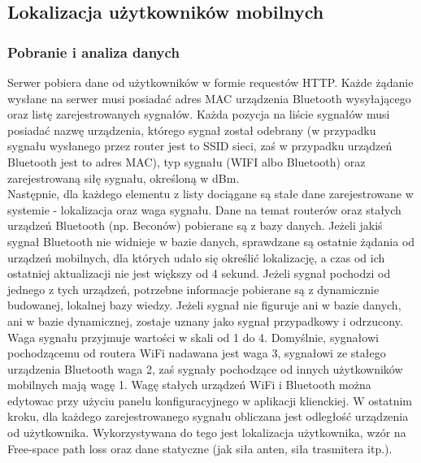\subsection{Lokalizacja użytkowników mobilnych}
\subsubsection{Pobranie i analiza danych}
Serwer pobiera dane od użytkowników w formie requestów HTTP. Każde żądanie wysłane na serwer musi posiadać adres MAC urządzenia Bluetooth wysyłającego oraz listę zarejestrowanych sygnałów. Każda pozycja na liście sygnałów musi posiadać nazwę urządzenia, którego sygnał został odebrany (w przypadku sygnału wysłanego przez router jest to SSID sieci, zaś w przypadku urządzeń Bluetooth jest to adres MAC), typ sygnału (WIFI albo Bluetooth) oraz zarejestrowaną siłę sygnału, określoną w dBm. \\
Następnie, dla każdego elementu z listy dociągane są stałe dane zarejestrowane w systemie - lokalizacja oraz waga sygnału. Dane na temat routerów oraz stałych urządzeń Bluetooth (np. Beconów) pobierane są z bazy danych. Jeżeli jakiś sygnał Bluetooth nie widnieje w bazie danych, sprawdzane są ostatnie żądania od urządzeń mobilnych, dla których udało się określić lokalizację, a czas od ich ostatniej aktualizacji nie jest większy od 4 sekund. Jeżeli sygnał pochodzi od jednego z tych urządzeń, potrzebne informacje pobierane są z dynamicznie budowanej, lokalnej bazy wiedzy. Jeżeli sygnał nie figuruje ani w bazie danych, ani w bazie dynamicznej, zostaje uznany jako sygnał przypadkowy i odrzucony. Waga sygnału przyjmuje wartości w skali od 1 do 4. Domyślnie, sygnałowi pochodzącemu od routera WiFi nadawana jest waga 3, sygnałowi ze stałego urządzenia Bluetooth waga 2, zaś sygnały pochodzące od innych użytkowników mobilnych mają wagę 1. Wagę stałych urządzeń WiFi i Bluetooth można edytowac przy użyciu panelu konfiguracyjnego w aplikacji klienckiej. W ostatnim kroku, dla każdego zarejestrowanego sygnału obliczana jest odległość urządzenia od użytkownika. Wykorzystywana do tego jest lokalizacja użytkownika, wzór na Free-space path loss oraz dane statyczne (jak siła anten, siła trasmitera itp.).\\
